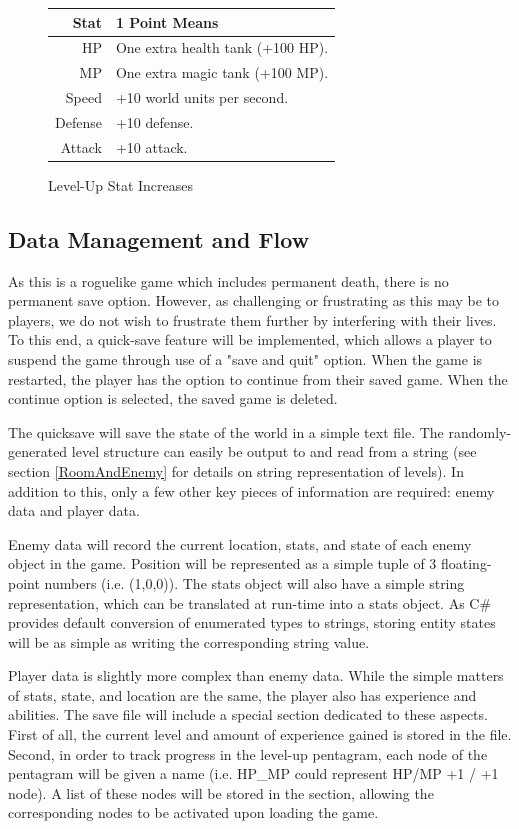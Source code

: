 \documentclass{article}
\begin{document}
\begin{figure}[h!]
\begin{tabular}{|r|l|}
\hline
Stat & 1 Point Means \\
\hline
HP & One extra health tank (+100 HP). \\
MP & One extra magic tank (+100 MP). \\
Speed & +10 world units per second. \\
Defense & +10 defense. \\
Attack & +10 attack. \\
\hline
\end{tabular}
\caption{Level-Up Stat Increases}
\label{LevelupStats}
\end{figure}

\subsection{Data Management and Flow}

As this is a roguelike game which includes permanent death, there is no permanent save option.  However, as challenging or frustrating as this may be to players, we do not wish to frustrate them further by interfering with their lives.  To this end, a quick-save feature will be implemented, which allows a player to suspend the game through use of a "save and quit" option.  When the game is restarted, the player has the option to continue from their saved game.  When the continue option is selected, the saved game is deleted.

The quicksave will save the state of the world in a simple text file.  The randomly-generated level structure can easily be output to and read from a string (see section \ref{RoomAndEnemy}
for details on string representation of levels).  In addition to this, only a few other key pieces of information are required: enemy data and player data.

Enemy data will record the current location, stats, and state of each enemy object in the game.  Position will be represented as a simple tuple of 3 floating-point numbers (i.e. (1,0,0)).  The stats object will also have a simple string representation, which can be translated at run-time into a stats object.  As C\# provides default conversion of enumerated types to strings, storing entity states will be as simple as writing the corresponding string value.

Player data is slightly more complex than enemy data.  While the simple matters of stats, state, and location are the same, the player also has experience and abilities.  The save file will include a special section dedicated to these aspects.  First of all, the current level and amount of experience gained is stored in the file.  Second, in order to track progress in the level-up pentagram, each node of the pentagram will be given a name (i.e. HP\_MP could represent HP/MP +1 / +1 node).  A list of these nodes will be stored in the section, allowing the corresponding nodes to be activated upon loading the game.
\end{document}
